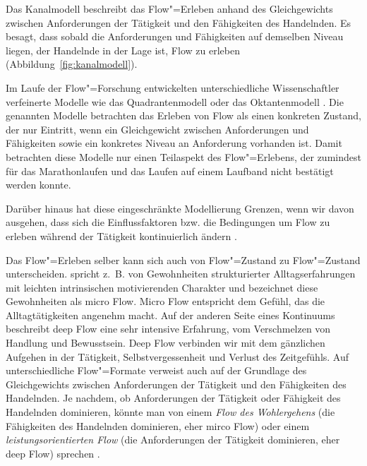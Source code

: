 Das Kanalmodell beschreibt das Flow"=Erleben anhand des Gleichgewichts zwischen Anforderungen der Tätigkeit und den Fähigkeiten des Handelnden. Es besagt, dass sobald die Anforderungen und Fähigkeiten auf demselben Niveau liegen, der Handelnde in der Lage ist, Flow zu erleben (Abbildung~\ref{fig:kanalmodell}). 

Im Laufe der Flow"=Forschung entwickelten unterschiedliche Wissenschaftler verfeinerte Modelle wie das Quadrantenmodell \citep[S.~286]{Csikszentmihalyi1995} oder das Oktantenmodell \citep[S.~296]{Massimini1995}. Die genannten Modelle betrachten das Erleben von Flow als einen konkreten Zustand, der nur Eintritt, wenn ein Gleichgewicht zwischen Anforderungen und Fähigkeiten sowie ein konkretes Niveau an Anforderung vorhanden ist. Damit betrachten diese Modelle nur einen Teilaspekt des Flow"=Erlebens, der zumindest für das Marathonlaufen \citep{Stoll2005} und das Laufen auf einem Laufband \citep{Reinhardt2006} nicht bestätigt werden konnte. 

Darüber hinaus hat diese eingeschränkte Modellierung Grenzen, wenn wir davon ausgehen, dass sich die Einflussfaktoren bzw. die Bedingungen um Flow zu erleben während der Tätigkeit kontinuierlich ändern \citep{Grueter2016b}.

Das Flow"=Erleben selber kann sich auch von Flow"=Zustand zu Flow"=Zustand unterscheiden. \citet[][S.~222]{Csikszentmihalyi2010} spricht z.~B. von Gewohnheiten strukturierter Alltagserfahrungen mit leichten intrinsischen motivierenden Charakter und bezeichnet diese Gewohnheiten als micro Flow. Micro Flow entspricht dem Gefühl, das die Alltagtätigkeiten angenehm macht. Auf der anderen Seite eines Kontinuums beschreibt deep Flow eine sehr intensive Erfahrung, vom Verschmelzen von Handlung und Bewusstsein. Deep Flow verbinden wir mit dem gänzlichen Aufgehen in der Tätigkeit, Selbstvergessenheit und Verlust des Zeitgefühls. Auf unterschiedliche Flow"=Formate verweist auch \citet{Moneta2012} auf der Grundlage des Gleichgewichts zwischen Anforderungen der Tätigkeit und den Fähigkeiten des Handelnden. Je nachdem, ob Anforderungen der Tätigkeit oder Fähigkeit des Handelnden dominieren, könnte man von einem \emph{Flow des Wohlergehens} (die Fähigkeiten des Handelnden dominieren, eher mirco Flow) oder einem \emph{leistungsorientierten Flow} (die Anforderungen der Tätigkeit dominieren, eher deep Flow) sprechen \citep{Grueter2016b}.

